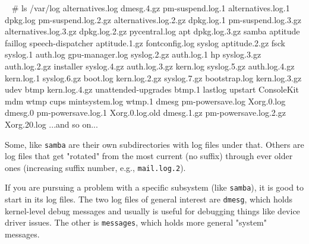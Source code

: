 \documentclass[10pt,american,]{book}
\newenvironment{Shaded}{\begin{snugshade}}{\end{snugshade}}
\newcommand{\KeywordTok}[1]{\textcolor[rgb]{0.13,0.29,0.53}{\textbf{{#1}}}}
\newcommand{\CommentTok}[1]{\textcolor[rgb]{0.56,0.35,0.01}{\textit{{#1}}}}
\newcommand{\NormalTok}[1]{{#1}}
\numberwithin{figure}{chapter}
\renewcommand{\KeywordTok}[1]{{#1}}
\renewcommand{\CommentTok}[1]{{#1}}
\renewcommand{\NormalTok}[1]{{#1}}
\begin{document}
\begin{Shaded}
\begin{Highlighting}[]
\KeywordTok{~} \CommentTok{# ls /var/log}
\KeywordTok{alternatives.log}       \NormalTok{dmesg.4.gz             pm-suspend.log.1}
\KeywordTok{alternatives.log.1}     \NormalTok{dpkg.log               pm-suspend.log.2.gz}
\KeywordTok{alternatives.log.2.gz}  \NormalTok{dpkg.log.1             pm-suspend.log.3.gz}
\KeywordTok{alternatives.log.3.gz}  \NormalTok{dpkg.log.2.gz          pycentral.log}
\KeywordTok{apt}                    \NormalTok{dpkg.log.3.gz          samba}
\KeywordTok{aptitude}               \NormalTok{faillog                speech-dispatcher}
\KeywordTok{aptitude.1.gz}          \NormalTok{fontconfig.log         syslog}
\KeywordTok{aptitude.2.gz}          \NormalTok{fsck                   syslog.1}
\KeywordTok{auth.log}               \NormalTok{gpu-manager.log        syslog.2.gz}
\KeywordTok{auth.log.1}             \NormalTok{hp                     syslog.3.gz}
\KeywordTok{auth.log.2.gz}          \NormalTok{installer              syslog.4.gz}
\KeywordTok{auth.log.3.gz}          \NormalTok{kern.log               syslog.5.gz}
\KeywordTok{auth.log.4.gz}          \NormalTok{kern.log.1             syslog.6.gz}
\KeywordTok{boot.log}               \NormalTok{kern.log.2.gz          syslog.7.gz}
\KeywordTok{bootstrap.log}          \NormalTok{kern.log.3.gz          udev}
\KeywordTok{btmp}                   \NormalTok{kern.log.4.gz          unattended-upgrades}
\KeywordTok{btmp.1}                 \NormalTok{lastlog                upstart}
\KeywordTok{ConsoleKit}             \NormalTok{mdm                    wtmp}
\KeywordTok{cups}                   \NormalTok{mintsystem.log         wtmp.1}
\KeywordTok{dmesg}                  \NormalTok{pm-powersave.log       Xorg.0.log}
\KeywordTok{dmesg.0}                \NormalTok{pm-powersave.log.1     Xorg.0.log.old}
\KeywordTok{dmesg.1.gz}             \NormalTok{pm-powersave.log.2.gz  Xorg.20.log}
\KeywordTok{...and} \NormalTok{so on...}
\end{Highlighting}
\end{Shaded}

Some, like \texttt{samba} are their own subdirectories with log files
under that. Others are log files that get "rotated" from the most
current (no suffix) through ever older ones (increasing suffix number,
e.g., \texttt{mail.log.2}).

If you are pursuing a problem with a specific subsystem (like
\texttt{samba}), it is good to start in its log files. The two log files
of general interest are \texttt{dmesg}, which holds
kernel-level debug messages and usually is useful for debugging things
like device driver issues. The other is
\texttt{messages}, which holds more general "system"
messages.
\end{document}
